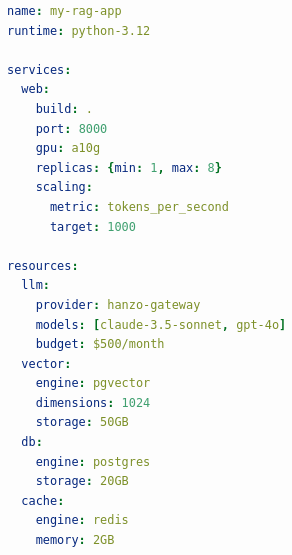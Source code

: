 \begin{lstlisting}[language=yaml,caption={Example hanzo.yaml for an AI application.}]
name: my-rag-app
runtime: python-3.12

services:
  web:
    build: .
    port: 8000
    gpu: a10g
    replicas: {min: 1, max: 8}
    scaling:
      metric: tokens_per_second
      target: 1000

resources:
  llm:
    provider: hanzo-gateway
    models: [claude-3.5-sonnet, gpt-4o]
    budget: $500/month
  vector:
    engine: pgvector
    dimensions: 1024
    storage: 50GB
  db:
    engine: postgres
    storage: 20GB
  cache:
    engine: redis
    memory: 2GB
\end{lstlisting}

